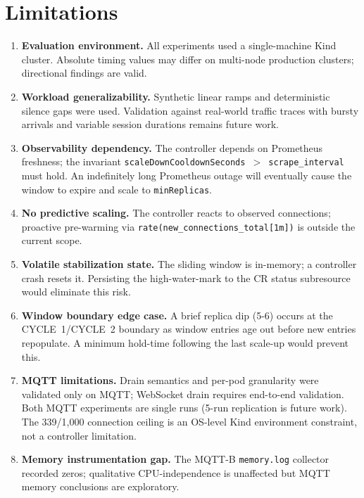 \documentclass[3p,twocolumn]{elsarticle}
\theoremstyle{plain}%
\theoremstyle{definition}%
\begin{document}
\section{Limitations}
\label{sec:limitations}

\begin{enumerate}[leftmargin=*]

\item \textbf{Evaluation environment.} All experiments used a single-machine Kind cluster. Absolute timing values may differ on multi-node production clusters; directional findings are valid.

\item \textbf{Workload generalizability.} Synthetic linear ramps and deterministic silence gaps were used. Validation against real-world traffic traces with bursty arrivals and variable session durations remains future work.

\item \textbf{Observability dependency.} The controller depends on Prometheus freshness; the invariant \texttt{scaleDownCooldownSeconds $>$ scrape\_interval} must hold. An indefinitely long Prometheus outage will eventually cause the window to expire and scale to \texttt{minReplicas}.

\item \textbf{No predictive scaling.} The controller reacts to observed connections; proactive pre-warming via \texttt{rate(new\_connections\_total[1m])} is outside the current scope.

\item \textbf{Volatile stabilization state.} The sliding window is in-memory; a controller crash resets it. Persisting the high-water-mark to the CR status subresource would eliminate this risk.

\item \textbf{Window boundary edge case.} A brief replica dip (5-6) occurs at the CYCLE~1/CYCLE~2 boundary as window entries age out before new entries repopulate. A minimum hold-time following the last scale-up would prevent this.

\item \textbf{MQTT limitations.} Drain semantics and per-pod granularity were validated only on MQTT; WebSocket drain requires end-to-end validation. Both MQTT experiments are single runs (5-run replication is future work). The 339/1{,}000 connection ceiling is an OS-level Kind environment constraint, not a controller limitation.

\item \textbf{Memory instrumentation gap.} The MQTT-B \texttt{memory.log} collector recorded zeros; qualitative CPU-independence is unaffected but MQTT memory conclusions are exploratory.

\end{enumerate}
\end{document}
